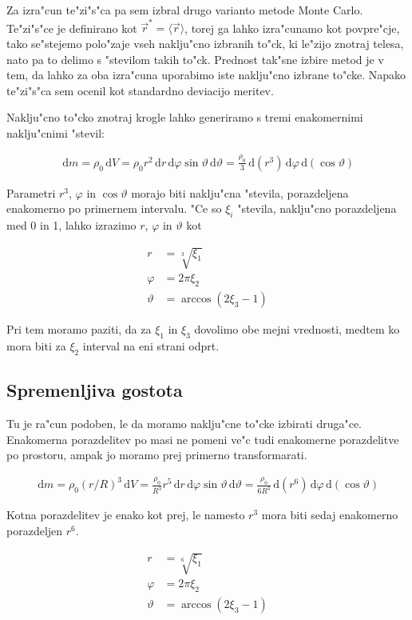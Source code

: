 \documentclass[a4paper,10pt]{article}
\renewcommand{\theta}{\vartheta}
\renewcommand{\phi}{\varphi}
\newcommand{\dd}{\,\mathrm{d}}
\begin{document}
Za izra"cun te"zi"s"ca pa sem izbral drugo varianto metode Monte Carlo. Te"zi"s"ce je definirano kot $\vec r^* = \langle\vec r\rangle$, torej ga lahko izra"cunamo kot povpre"cje, tako se"stejemo polo"zaje vseh naklju"cno izbranih to"ck, ki le"zijo znotraj telesa, nato pa to delimo s "stevilom takih to"ck. Prednost tak"sne izbire metod je v tem, da lahko za oba izra"cuna uporabimo iste naklju"cno izbrane to"cke. Napako te"zi"s"ca sem ocenil kot standardno deviacijo meritev. 

Naklju"cno to"cko znotraj krogle lahko generiramo s tremi enakomernimi naklju"cnimi "stevil:

\begin{align}
 \dd m = \rho_0 \dd V = \rho_0 r^2 \dd r \dd \phi \sin\theta \dd \theta = \frac{\rho_0}{3} \dd(r^3) \dd\phi \dd(\cos\theta)
\end{align}

Parametri $r^3$, $\phi$ in $\cos\theta$ morajo biti naklju"cna "stevila, porazdeljena enakomerno po primernem intervalu. "Ce so $\xi_i$ "stevila, naklju"cno porazdeljena med 0 in 1, lahko izrazimo $r$, $\phi$ in $\theta$ kot

\begin{align}
 r &= \sqrt[3]{\xi_1} \\
 \phi &= 2\pi\xi_2 \\
 \theta &= \arccos (2\xi_3 - 1)
\end{align}

Pri tem moramo paziti, da za $\xi_1$ in $\xi_3$ dovolimo obe mejni vrednosti, medtem ko mora biti za $\xi_2$ interval na eni strani odprt. 

\subsection{Spremenljiva gostota}
Tu je ra"cun podoben, le da moramo naklju"cne to"cke izbirati druga"ce. Enakomerna porazdelitev po masi ne pomeni ve"c tudi enakomerne porazdelitve po prostoru, ampak jo moramo prej primerno transformarati. 

\begin{align}
 \dd m = \rho_0 (r/R)^3 \dd V = \frac{\rho_0}{R^3} r^5 \dd r \dd \phi \sin\theta \dd \theta = \frac{\rho_0}{6R^3} \dd(r^6) \dd\phi \dd(\cos\theta)
\end{align}

Kotna porazdelitev je enako kot prej, le namesto $r^3$ mora biti sedaj enakomerno porazdeljen $r^6$. 

\begin{align}
 r &= \sqrt[6]{\xi_1} \\
 \phi &= 2\pi\xi_2 \\
 \theta &= \arccos (2\xi_3 - 1)
\end{align}
\end{document}
